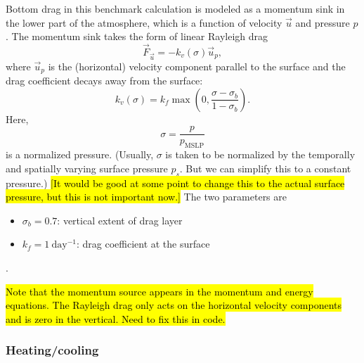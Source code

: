 \documentclass{report}
\begin{document}
Bottom drag in this benchmark calculation is modeled as a momentum sink in the lower part of the atmosphere, which is a function of velocity $\vec{u}$ and pressure $p$. The momentum sink takes the form of linear Rayleigh drag
\begin{equation}
    \vec{F}_{\vec{u}} = -k_v(\sigma) \vec{u}_p,
\end{equation}
where $\vec{u}_p$ is the (horizontal) velocity component parallel to the surface and the drag coefficient decays away from the surface:
\begin{equation}
    k_v(\sigma) = k_f \max \left( 0, \frac{\sigma - \sigma_b}{1-\sigma_b} \right).
\end{equation}
Here,
\[
\sigma = \frac{p}{p_{\mathrm{MSLP}}}
\]
is a normalized pressure. (Usually, $\sigma$ is taken to be normalized by the temporally and spatially varying surface pressure $p_s$. But we can simplify this to a constant pressure.) \hl{[It would be good at some point to change this to the actual surface pressure, but this is not important now.]} The two parameters are
\begin{itemize}
    \item $\sigma_b = 0.7$: vertical extent of drag layer
    \item $k_f = 1~\mathrm{day^{-1}}$: drag coefficient at the surface
\end{itemize}.

\hl{Note that the momentum source appears in the momentum and energy equations. The Rayleigh drag only acts on the horizontal velocity components and is zero in the vertical. Need to fix this in code.}

\subsubsection{Heating/cooling}
\end{document}
